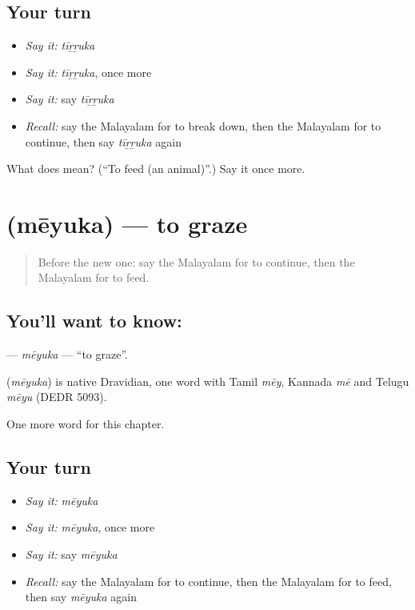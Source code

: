 \subsection*{Your turn}
\begin{itemize}
\raggedright
  \item \emph{Say it:} \emph{tīṟṟuka}
  \item \emph{Say it:} \emph{tīṟṟuka}, once more
  \item \emph{Say it:} say \emph{tīṟṟuka}
  \item \emph{Recall:} say the Malayalam for to break down, then the Malayalam for to continue, then say \emph{tīṟṟuka} again
\end{itemize}

\begin{tcolorbox}[breakable,colback=teal!4,colframe=teal!35!black,title={Before you move on}]
What does  mean? (\textquotedblleft{}To feed (an animal)\textquotedblright{}.) Say it once more.
\end{tcolorbox}
\section[\texorpdfstring{\ml{മേയുക} (mēyuka)}{മേയുക (mēyuka)}]{ (mēyuka) — to graze}

\label{lesson:ML-C272-meyuka}



\begin{quote}
Before the new one: say the Malayalam for to continue, then the Malayalam for to feed.
\end{quote}

\subsection*{You'll want to know: }
\textbf{} — \emph{mēyuka} — \textquotedblleft{}to graze\textquotedblright{}.

\begin{cousinweb}
\textbf{} (\emph{mēyuka}) is native Dravidian, one word with Tamil \emph{mēy}, Kannada \emph{mē} and Telugu \emph{mēyu} (DEDR 5093).
\end{cousinweb}

\begin{grammarlens}[title={What you've built}]
One more word for this chapter.
\end{grammarlens}

\subsection*{Your turn}
\begin{itemize}
\raggedright
  \item \emph{Say it:} \emph{mēyuka}
  \item \emph{Say it:} \emph{mēyuka}, once more
  \item \emph{Say it:} say \emph{mēyuka}
  \item \emph{Recall:} say the Malayalam for to continue, then the Malayalam for to feed, then say \emph{mēyuka} again
\end{itemize}

